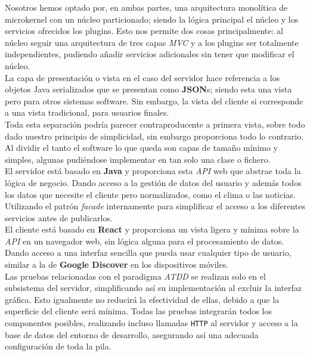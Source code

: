 \documentclass[../ei103948-project-documentation.tex]{subfiles}
\begin{document}
    Nosotros hemos optado por, en ambas partes, una arquitectura monolítica de microkernel con un núcleo particionado; siendo la lógica principal el núcleo y los servicios ofrecidos los plugins. Esto nos permite dos cosas principalmente: al núcleo seguir una arquitectura de tres capas \textit{MVC} y a los plugins ser totalmente independientes, pudiendo añadir servicios adicionales sin tener que modificar el núcleo.\\

    La capa de presentación o vista en el caso del servidor hace referencia a los objetos Java serializados que se presentan como \textbf{JSON}s; siendo esta una vista pero para otros sistemas software. Sin embargo, la vista del cliente si corresponde a una vista tradicional, para usuarios finales.\\

    Toda esta separación podría parecer contraproducente a primera vista, sobre todo dado nuestro principio de simplicidad, sin embargo proporciona todo lo contrario. Al dividir el tanto el software lo que queda son capas de tamaño mínimo y simples, algunas pudiéndose implementar en tan solo una clase o fichero.\\

    El servidor está basado en \textbf{Java} y proporciona esta \textit{API} web que abstrae toda la lógica de negocio. Dando acceso a la gestión de datos del usuario y además todos los datos que necesite el cliente pero normalizados, como el clima o las noticias. Utilizando el patrón \textit{facade} internamente para simplificar el acceso a los diferentes servicios antes de publicarlos.\\

    El cliente está basado en \textbf{React} y proporciona un vista ligera y mínima sobre la \textit{API} en un navegador web, sin lógica alguna para el procesamiento de datos. Dando acceso a una interfaz sencilla que pueda usar cualquier tipo de usuario, similar a la de \textbf{Google Discover} en los dispositivos móviles.\\

    Las pruebas relacionadas con el paradigma \textit{ATDD} se realizan solo en el subsistema del servidor, simplificando así su implementación al excluir la interfaz gráfica. Esto igualmente no reducirá la efectividad de ellas, debido a que la superficie del cliente será mínima. Todas las pruebas integrarán todos los componentes posibles, realizando incluso llamadas \texttt{HTTP} al servidor y acceso a la base de datos del entorno de desarrollo, asegurando así una adecuada configuración de toda la pila.
\end{document}
